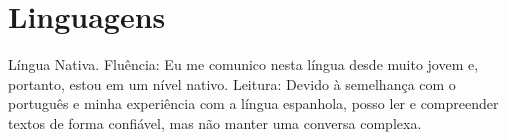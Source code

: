\section{Linguagens}
{Língua Nativa.}
{Fluência: Eu me comunico nesta língua desde muito jovem e, portanto, estou em um nível nativo.}
{Leitura: Devido à semelhança com o português e minha experiência com a língua espanhola, posso ler e compreender textos de forma confiável, mas não manter uma conversa complexa.}
